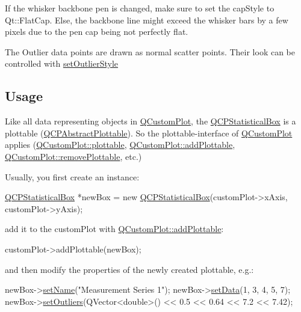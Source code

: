 If the whisker backbone pen is changed, make sure to set the cap\+Style to Qt\+::\+Flat\+Cap. Else, the backbone line might exceed the whisker bars by a few pixels due to the pen cap being not perfectly flat.

The Outlier data points are drawn as normal scatter points. Their look can be controlled with \hyperlink{class_q_c_p_statistical_box_ad5241943422eb8e58360a97e99ad6aa7}{set\+Outlier\+Style}\hypertarget{class_q_c_p_statistical_box_usage}{}\subsection{Usage}\label{class_q_c_p_statistical_box_usage}
Like all data representing objects in \hyperlink{class_q_custom_plot}{Q\+Custom\+Plot}, the \hyperlink{class_q_c_p_statistical_box}{Q\+C\+P\+Statistical\+Box} is a plottable (\hyperlink{class_q_c_p_abstract_plottable}{Q\+C\+P\+Abstract\+Plottable}). So the plottable-\/interface of \hyperlink{class_q_custom_plot}{Q\+Custom\+Plot} applies (\hyperlink{class_q_custom_plot_a32de81ff53e263e785b83b52ecd99d6f}{Q\+Custom\+Plot\+::plottable}, \hyperlink{class_q_custom_plot_ab7ad9174f701f9c6f64e378df77927a6}{Q\+Custom\+Plot\+::add\+Plottable}, \hyperlink{class_q_custom_plot_af3dafd56884208474f311d6226513ab2}{Q\+Custom\+Plot\+::remove\+Plottable}, etc.)

Usually, you first create an instance\+: 
\begin{DoxyCode}
\hyperlink{class_q_c_p_statistical_box}{QCPStatisticalBox} *newBox = \textcolor{keyword}{new} \hyperlink{class_q_c_p_statistical_box_a75c2b3e7fcd0741cc981693a2ba63b27}{QCPStatisticalBox}(customPlot->xAxis, 
      customPlot->yAxis);
\end{DoxyCode}
 add it to the custom\+Plot with \hyperlink{class_q_custom_plot_ab7ad9174f701f9c6f64e378df77927a6}{Q\+Custom\+Plot\+::add\+Plottable}\+: 
\begin{DoxyCode}
customPlot->addPlottable(newBox);
\end{DoxyCode}
 and then modify the properties of the newly created plottable, e.\+g.\+: 
\begin{DoxyCode}
newBox->\hyperlink{class_q_c_p_abstract_plottable_ab79c7ba76bc7fa89a4b3580e12149f1f}{setName}(\textcolor{stringliteral}{"Measurement Series 1"});
newBox->\hyperlink{class_q_c_p_statistical_box_adf50c57b635edb12470c0e4a986aff37}{setData}(1, 3, 4, 5, 7);
newBox->\hyperlink{class_q_c_p_statistical_box_af9bc09620e0bf93bf444ee35e5800d1d}{setOutliers}(QVector<double>() << 0.5 << 0.64 << 7.2 << 7.42);
\end{DoxyCode}
 

